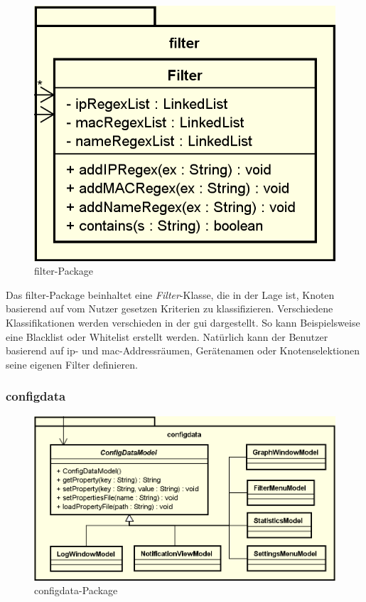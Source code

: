     \begin{figure}[H]
      \centering
      \includegraphics[width=\textwidth]{../diagramimages/filter.png}
      \caption{filter-Package}
    \end{figure}
    
    \medskip
    Das filter-Package beinhaltet eine \textit{Filter}-Klasse, die in der Lage ist,
    Knoten basierend auf vom Nutzer gesetzen Kriterien zu klassifizieren. Verschiedene
    Klassifikationen werden verschieden in der \gls{gui} dargestellt. So kann
    Beispielsweise eine Blacklist oder Whitelist erstellt werden.
    Natürlich kann der Benutzer basierend auf \gls{ip}- und \gls{mac}-Addressräumen,
    Gerätenamen oder Knotenselektionen seine eigenen Filter definieren.

    \subsubsection{configdata}
    \label{subsubsec:configdata}
    
    \begin{figure}[H]
      \centering
      \includegraphics[width=\textwidth]{../diagramimages/configdata.png}
      \caption{configdata-Package}
    \end{figure}
    
